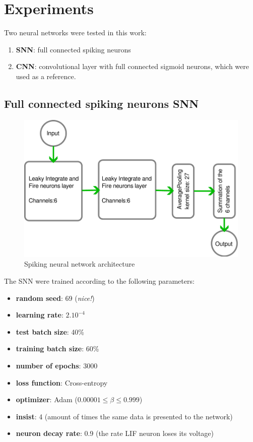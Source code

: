 \section{Experiments}
	\label{sec:experiments}
	\par Two neural networks were tested in this work:
	\begin{enumerate}
		\item \label{itm:snn} \textbf{SNN}: full connected spiking neurons
		\item \label{itm:cnn} \textbf{CNN}: convolutional layer with full connected sigmoid neurons, which were used as a reference.
	\end{enumerate}

	\subsection{Full connected spiking neurons SNN}
	\begin{figure}[H]
		\centering
		\includegraphics[width=.6\linewidth]{images/architectureSNN}
		\caption{Spiking neural network architecture}
		\label{fig:architecturesnn}
	\end{figure}
	\begin{multicols}{2}
		\par The SNN were trained according to the following parameters:
		\begin{itemize}
			\item \textbf{random seed}: 69 (\textit{nice!})
			\item \textbf{learning rate}: $2.10^{-4}$
			\item \textbf{test batch size}: 40\%
			\item \textbf{training batch size}: 60\%
			\item \textbf{number of epochs}: 3000
			\item \textbf{loss function}: Cross-entropy
			\item \textbf{optimizer}: Adam ($0.00001 \leq \beta \leq 0.999$)
			\item \textbf{insist}: 4 (amount of times the same data is presented to the network)
			\item \textbf{neuron decay rate}: 0.9 (the rate LIF neuron loses its voltage)
		\end{itemize}
	\columnbreak	
		
	\end{multicols}


